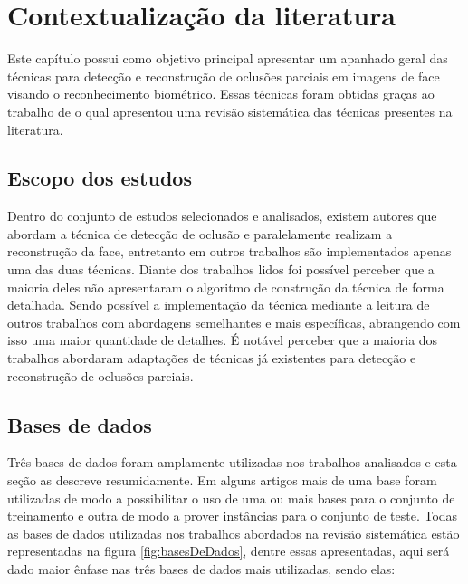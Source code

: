 \chapter{Contextualização da literatura}
\label{apen4:contextualizacao_literatura}


Este  capítulo possui como objetivo principal apresentar um apanhado geral das técnicas para detecção e reconstrução de oclusões parciais em imagens de face visando o reconhecimento biométrico. Essas técnicas foram obtidas graças ao trabalho de  o qual apresentou uma revisão sistemática das técnicas presentes na literatura. 


\section{Escopo dos estudos}

Dentro do conjunto de estudos selecionados e analisados, existem autores que abordam a técnica de detecção de oclusão e paralelamente realizam a reconstrução da face, entretanto em outros trabalhos são implementados apenas uma das duas técnicas. Diante dos trabalhos lidos foi possível perceber que a maioria deles não apresentaram o algoritmo de construção da técnica de forma detalhada. Sendo possível a implementação da técnica mediante a leitura de outros trabalhos com abordagens semelhantes e mais específicas, abrangendo com isso uma maior quantidade de detalhes. É notável perceber que a maioria dos trabalhos abordaram adaptações de técnicas já existentes para detecção e reconstrução de oclusões parciais. 



\section{Bases de dados}
\label{sec:base de dados}

Três bases de dados foram amplamente utilizadas nos trabalhos analisados e esta seção as descreve resumidamente. Em alguns artigos mais de uma base foram utilizadas de modo a possibilitar o uso de uma ou mais bases para o conjunto de treinamento e outra de modo a prover instâncias para o conjunto de teste. Todas as bases de dados utilizadas nos trabalhos abordados na revisão sistemática estão representadas na figura \ref{fig:basesDeDados}, dentre essas apresentadas, aqui será dado maior ênfase nas três bases de dados mais utilizadas, sendo elas:

